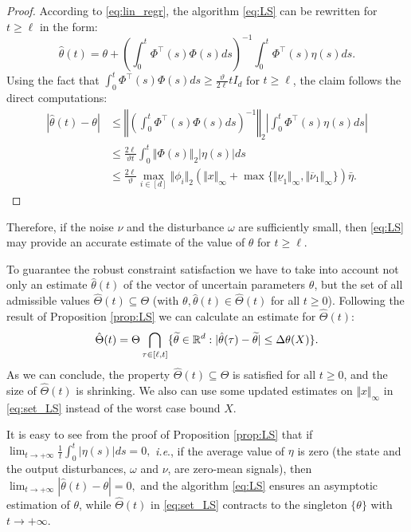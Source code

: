 \documentclass[letterpaper, 10 pt, conference]{ieeeconf}  %
\begin{document}
\begin{proof}
According to \eqref{eq:lin_regr}, the algorithm \eqref{eq:LS} can
be rewritten for $t\geq\ell$ in the form:
\[
\hat{\theta}(t)=\theta+\left(\int_{0}^{t}\Phi^{\top}(s)\Phi(s)ds\right)^{-1}\int_{0}^{t}\Phi^{\top}(s)\eta(s)ds.
\]
Using the fact that $\int_{0}^{t}\Phi^{\top}(s)\Phi(s)ds\geq\frac{\vartheta}{2\ell}tI_{d}$
for $t\geq\ell$, the claim follows the direct computations:
\begin{align*}
|\hat{\theta}(t)-\theta|&\leq\left\Vert \left(\int_{0}^{t}\Phi^{\top}(s)\Phi(s)ds\right)^{-1}\right\Vert _{2}\left|\int_{0}^{t}\Phi^{\top}(s)\eta(s)ds\right|\\
&\leq\frac{2\ell}{\vartheta t}\int_{0}^{t}\Vert\Phi(s)\Vert_{2}|\eta(s)|ds\\
&\leq\frac{2\ell}{\vartheta}\max_{i\in[d]}\Vert\phi_{i}\Vert_{2}(\Vert x\Vert_{\infty}+\max\{\Vert\underline{\nu}_{1}\Vert_{\infty},\Vert\overline{\nu}_{1}\Vert_{\infty}\})\bar{\eta}.
\end{align*}
\end{proof}
Therefore, if the noise $\nu$ and the disturbance $\omega$ are sufficiently
small, then \eqref{eq:LS} may provide an accurate estimate of the
value of $\theta$ for $t\geq\ell$.

To guarantee the robust constraint satisfaction we have to take into
account not only an estimate $\hat{\theta}(t)$ of the vector of uncertain
parameters $\theta$, but the set of all admissible values $\hat{\Theta}(t)\subseteq\Theta$
(with $\theta,\hat{\theta}(t)\in\hat{\Theta}(t)$ for all $t\geq0$).
Following the result of Proposition \ref{prop:LS} we can calculate
an estimate for $\hat{\Theta}(t)$:
\begin{equation}
\hat{\Theta}(t)=\Theta\bigcap_{\tau\in[\ell,t]}\{\widetilde{\theta}\in\mathbb{R}^{d}:|\hat{\theta}(\tau)-\widetilde{\theta}|\leq\Delta\theta(X)\}.\label{eq:set_LS}
\end{equation}
As we can conclude, the property $\hat{\Theta}(t)\subseteq\Theta$
is satisfied for all $t\geq0$, and the size of $\hat{\Theta}(t)$
is shrinking. We also can use some updated estimates on $\Vert x\Vert_{\infty}$
in \eqref{eq:set_LS} instead of the worst case bound $X$.
\begin{remark}
It is easy to see from the proof of Proposition \ref{prop:LS} that
if
$
\lim_{t\to+\infty}\frac{1}{t}\int_{0}^{t}|\eta(s)|ds=0,
$
\emph{i.e}., if the average value of $\eta$ is zero (the state and
the output disturbances, $\omega$ and $\nu$, are zero-mean signals),
then
$
\lim_{t\to+\infty}|\hat{\theta}(t)-\theta|=0,
$
and the algorithm \eqref{eq:LS} ensures an asymptotic estimation
of $\theta$, while $\hat{\Theta}(t)$ in \eqref{eq:set_LS} contracts
to the singleton $\{\theta\}$ with $t\to+\infty$.
\end{remark}
\end{document}
